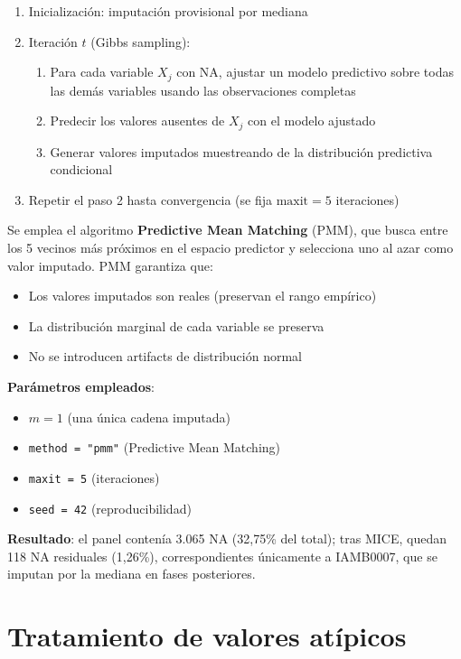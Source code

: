 \begin{enumerate}
    \item Inicialización: imputación provisional por mediana
    \item Iteración $t$ (Gibbs sampling):
    \begin{enumerate}
        \item Para cada variable $X_j$ con NA, ajustar un modelo predictivo sobre todas las demás variables usando las observaciones completas
        \item Predecir los valores ausentes de $X_j$ con el modelo ajustado
        \item Generar valores imputados muestreando de la distribución predictiva condicional
    \end{enumerate}
    \item Repetir el paso 2 hasta convergencia (se fija $\text{maxit} = 5$ iteraciones)
\end{enumerate}

Se emplea el algoritmo \textbf{Predictive Mean Matching} (PMM), que busca entre los 5 vecinos más próximos en el espacio predictor y selecciona uno al azar como valor imputado. PMM garantiza que:
\begin{itemize}
    \item Los valores imputados son reales (preservan el rango empírico)
    \item La distribución marginal de cada variable se preserva
    \item No se introducen artifacts de distribución normal
\end{itemize}

\textbf{Parámetros empleados}:
\begin{itemize}
    \item $m = 1$ (una única cadena imputada)
    \item \texttt{method = "pmm"} (Predictive Mean Matching)
    \item \texttt{maxit = 5} (iteraciones)
    \item \texttt{seed = 42} (reproducibilidad)
\end{itemize}

\textbf{Resultado}: el panel contenía 3.065 NA (32,75\% del total); tras MICE, quedan 118 NA residuales (1,26\%), correspondientes únicamente a IAMB0007, que se imputan por la mediana en fases posteriores.

\section{Tratamiento de valores atípicos}

